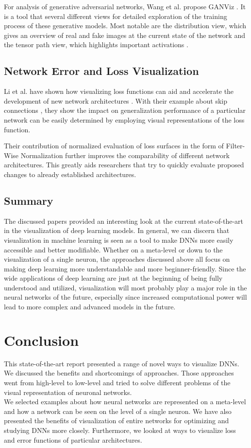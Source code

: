 \documentclass{acmsiggraph}               %
\begin{document}
For analysis of generative adversarial networks, Wang et al. propose GANViz \cite{Wang}. It is a tool that several different views for detailed exploration of the training process of these generative models. Most notable are the distribution view, which gives an overview of real and fake images at the current state of the network and the tensor path view, which highlights important activations \cite{Wang}.

\subsection{Network Error and Loss Visualization}

Li et al. have shown how visualizing loss functions can aid and accelerate the development of new network architectures \cite{Li2017}.
With their example about skip connections \cite{He2015}, they show the impact on generalization performance of a particular network can be easily determined by employing visual representations of the loss function.

Their contribution of normalized evaluation of loss surfaces in the form of Filter-Wise Normalization further improves the comparability of different network architectures. This greatly aids researchers that try to quickly evaluate proposed changes to already established architectures.

\subsection{Summary}
The discussed papers provided an interesting look at the current state-of-the-art in the visualization of deep learning models. In general, we can discern that visualization in machine learning is seen as a tool to make DNNs more easily accessible and better modifiable. Whether on a meta-level or down to the visualization of a single neuron, the approaches discussed above all focus on making deep learning more understandable and more beginner-friendly. Since the wide applications of deep learning are just at the beginning of being fully understood and utilized, visualization will most probably play a major role in the neural networks of the future, especially since increased computational power will lead to more complex and advanced models in the future.

\section{Conclusion}
This state-of-the-art report presented a range of novel ways to visualize DNNs. We discussed the benefits and shortcomings of approaches. Those approaches went from high-level to low-level and tried to solve different problems of the visual representation of neuronal networks.\\
We selected examples about how neural networks are represented on a meta-level and how a network can be seen on the level of a single neuron. We have also presented the benefits of visualization of entire networks for optimizing and studying DNNs more closely. Furthermore, we looked at ways to visualize loss and error functions of particular architectures.\\
\end{document}
